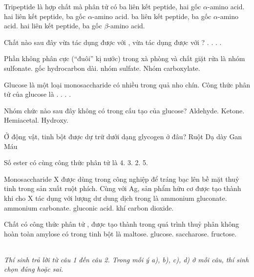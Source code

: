 \documentclass[11pt,a4paper]{article}
\begin{document}
\begin{ex}
Tripeptide là hợp chất mà phân tử có
\choice
{ba liên kết peptide, hai gốc $\alpha$-amino acid.}
{hai liên kết peptide, ba gốc $\alpha$-amino acid.}
{ba liên kết peptide, ba gốc $\alpha$-amino acid.}
{hai liên kết peptide, ba gốc $\beta$-amino acid.}
\loigiai{}
\end{ex}
\begin{ex}
Chất nào sau đây vừa tác dụng được với , vừa tác dụng được với ?
\choice
{.}
{.}
{.}
{.}
\loigiai{}
\end{ex}
\begin{ex}
Phần không phân cực (``đuôi'' kị nước) trong xà phòng và chất giặt rửa là
\choice
{nhóm sulfonate.}
{gốc hydrocarbon dài.}
{nhóm sulfate.}
{Nhóm carboxylate.}
\loigiai{}
\end{ex}
\begin{ex}
Glucose là một loại monosaccharide có nhiều trong quả nho chín. Công thức phân tử của glucose là
\choice
{.}
{.}
{.}
{.}
\loigiai{}
\end{ex}
\begin{ex}
Nhóm chức nào sau đây không có trong cấu tạo của glucose?
\choice
{Aldehyde.}
{Ketone.}
{Hemiacetal.}
{Hydroxy.}
\loigiai{}
\end{ex}
\begin{ex}
Ở động vật, tinh bột được dự trữ dưới dạng glycogen ở đâu?
\choice
{Ruột}
{Dạ dày}
{Gan}
{Máu}
\loigiai{}
\end{ex}
\begin{ex}
Số ester có cùng công thức phân tử  là
\choice
{4.}
{3.}
{2.}
{5.}
\loigiai{}
\end{ex}
\begin{ex}
Monosaccharide X được dùng trong công nghiệp để tráng bạc lên bề mặt thuỷ tinh trong sản xuất ruột phích. Cùng với Ag, sản phẩm hữu cơ được tạo thành khi cho X tác dụng với lượng dư dung dịch  trong  là
\choice
{ammonium gluconate.}
{ammonium carbonate.}
{gluconic acid.}
{khí carbon dioxide.}
\loigiai{}
\end{ex}
\begin{ex}
Chất có công thức phân tử , được tạo thành trong quá trình thuỷ phân không hoàn toàn amylose có trong tinh bột là
\choice
{maltose.}
{glucose.}
{saccharose.}
{fructose.}
\loigiai{}
\end{ex}

\vspace{6pt}
 \\
\textit{Thí sinh trả lời từ câu 1 đến câu 2. Trong mỗi ý a), b), c), d) ở mỗi câu, thí sinh chọn đúng hoặc sai.}
\vspace{4pt}
\end{document}
